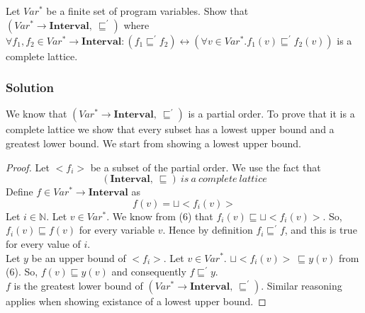 Let $Var^*$ be a finite set of program variables.
Show that $(Var^* \rightarrow \mathbf{Interval},\ \sqsubseteq^\prime)$ where $\forall f_1,f_2 \in Var^* \rightarrow \mathbf{Interval}:(f_1\sqsubseteq^\prime f_2)\longleftrightarrow (\forall v \in Var^*. f_1(v)\sqsubseteq^\prime f_2(v))$ is a complete lattice. 

\subsubsection*{Solution}
We know that $(Var^* \rightarrow \mathbf{Interval},\ \sqsubseteq^\prime)$ is a partial order. To prove that it is a complete lattice we show that every subset has a lowest upper bound and a greatest lower bound. We start from showing a lowest upper bound.
\begin{proof}
	Let $<f_i>$ be a subset of the partial order.
	We use the fact that
	\begin{equation}
	(\mathbf{Interval},\ \sqsubseteq)\ is\ a\ complete\ lattice
	\end{equation}
	Define $f \in Var^* \rightarrow \mathbf{Interval}$ as
	\begin{equation*}
	f(v)=\sqcup <f_i(v)>
	\end{equation*}
	Let $i \in \mathbb{N}$. Let $v \in Var^*$. We know from (6) that $f_i(v)\sqsubseteq \sqcup<f_i(v)>$. So, $f_i(v)\sqsubseteq f(v)$ for every variable $v$. Hence by definition $f_i\sqsubseteq^\prime f$, and this is true for every value of $i$.\\
	
	Let $y$ be an upper bound of $<f_i>$. Let $v \in Var^*$. $\sqcup<f_i(v)>\ \sqsubseteq y(v)$ from (6). So, $f(v)\sqsubseteq y(v)$ and consequently $f\sqsubseteq^\prime y$.\\
	
	$f$ is the greatest lower bound of $(Var^* \rightarrow \mathbf{Interval},\ \sqsubseteq^\prime)$. Similar reasoning applies when showing existance of a lowest upper bound.
\end{proof}